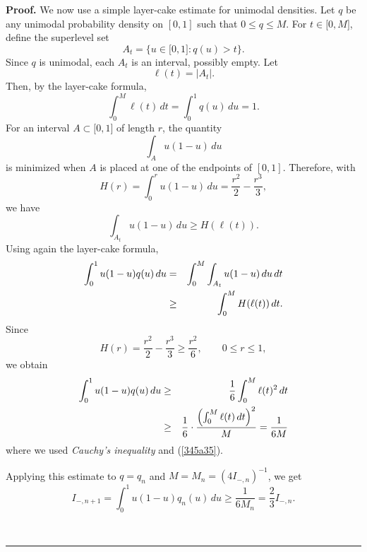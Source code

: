 \documentclass[onecolumn]{article}
\newenvironment{proof}[1][Proof]{\noindent\textbf{#1.} }{\ \rule{0.5em}{0.5em}}
\begin{document}
\begin{proof}
We now use a simple layer-cake estimate for unimodal densities. Let $q$ be
any unimodal probability density on $[0,1]$ such that $0\leq q\leq M$. For $%
t\in \lbrack 0,M]$, define the superlevel set 
\begin{equation}
A_{t}=\{u\in \lbrack 0,1]:q(u)>t\}.  \label{345a35a}
\end{equation}%
Since $q$ is unimodal, each $A_{t}$ is an interval, possibly empty. Let 
\begin{equation}
\ell (t)=|A_{t}|.  \label{345a35b}
\end{equation}%
Then, by the layer-cake formula, 
\begin{equation}
\int_{0}^{M}\ell (t)\,dt=\int_{0}^{1}q(u)\,du=1.  \label{345a35}
\end{equation}%
For an interval $A\subset \lbrack 0,1]$ of length $r$, the quantity 
\begin{equation}
\int_{A}u(1-u)\,du  \label{345a35aa}
\end{equation}%
is minimized when $A$ is placed at one of the endpoints of $[0,1]$.
Therefore, with 
\begin{equation}
H(r)=\int_{0}^{r}u(1-u)\,du=\frac{r^{2}}{2}-\frac{r^{3}}{3},  \label{345a36}
\end{equation}%
we have 
\begin{equation}
\int_{A_{t}}u(1-u)\,du\geq H(\ell (t)).  \label{345a37}
\end{equation}%
Using again the layer-cake formula, 
\begin{eqnarray}
\int_{0}^{1}u(1-u)q(u)\,du &=&\int_{0}^{M}\int_{A_{t}}u(1-u)\,du\,dt  \notag
\\
&\geq &\int_{0}^{M}H(\ell (t))\,dt.  \label{345a38}
\end{eqnarray}%
Since 
\begin{equation}
H(r)=\frac{r^{2}}{2}-\frac{r^{3}}{3}\geq \frac{r^{2}}{6},\qquad 0\leq r\leq
1,  \label{345a38a}
\end{equation}%
we obtain 
\begin{eqnarray}
\int_{0}^{1}u(1-u)q(u)\,du &\geq &\frac{1}{6}\int_{0}^{M}\ell (t)^{2}\,dt 
\notag \\
&\geq &\frac{1}{6}\cdot \frac{\left( \int_{0}^{M}\ell (t)\,dt\right) ^{2}}{M}%
=\frac{1}{6M}  \label{345a39}
\end{eqnarray}%
where we used \textit{Cauchy's inequality} and (\ref{345a35}).

Applying this estimate to $q=q_{n}$ and $M=M_{n}=(4I_{-,n})^{-1}$, we get 
\begin{equation}
I_{-,n+1}=\int_{0}^{1}u(1-u)q_{n}(u)\,du\geq \frac{1}{6M_{n}}=\frac{2}{3}%
I_{-,n}.  \label{345a40}
\end{equation}


\end{proof}
\end{document}
